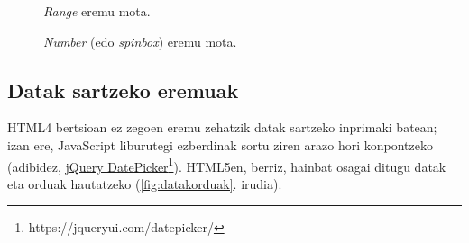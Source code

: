  \begin{figure}[ht]
	\centering
{}
\caption{\textit{Range} eremu mota.}
\label{fig:rangeeremumota}
\end{figure}

 \begin{figure}[ht]
	\centering
{}
\caption{\textit{Number} (edo \textit{spinbox}) eremu mota.}
\label{fig:numbereremumota}
\end{figure}


\subsection{Datak sartzeko eremuak}

 HTML4 bertsioan ez zegoen eremu zehatzik datak sartzeko inprimaki batean; izan ere, JavaScript liburutegi ezberdinak sortu ziren arazo hori konpontzeko (adibidez, \href{https://jqueryui.com/datepicker/}{jQuery DatePicker}\footnote{https://jqueryui.com/datepicker/}). HTML5en, berriz, hainbat osagai ditugu datak eta orduak hautatzeko (\ref{fig:datakorduak}. irudia).
 
